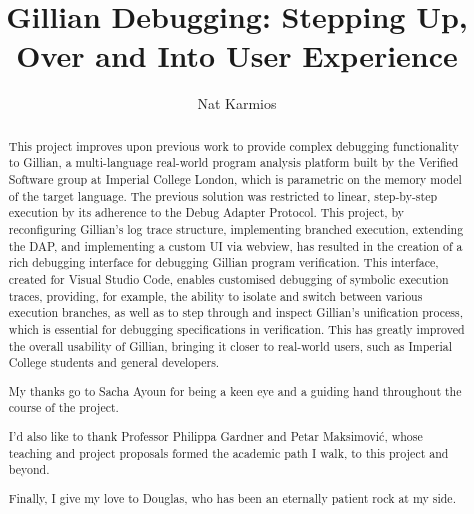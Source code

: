 \documentclass[a4paper, twoside]{report}
\title{Gillian Debugging: Stepping Up, Over and Into User Experience}
\author{Nat Karmios}
\begin{document}
\def\chapterautorefname{\normalcolor{Chapter}\color{blue}}
\def\sectionautorefname{\normalcolor{\S}\kern-0.7ex\color{blue}}
\def\subsectionautorefname{\normalcolor{\S}\kern-0.7ex\color{blue}}
\def\figureautorefname{\normalcolor{Figure}\color{blue}}
\def\lstnumberautorefname{\normalcolor{line}\color{blue}}
\newcommand{\sacha}[1]{\todo[color=green]{S: {#1}}}



\begin{abstract}
This project improves upon previous work to provide complex debugging functionality to
Gillian, a multi-language real-world program analysis platform built by the
Verified Software group at Imperial College London, which is parametric on the memory
model of the target language.
The previous solution was restricted to linear, step-by-step execution by its
adherence to the Debug Adapter Protocol. This project, by reconfiguring Gillian's log
trace structure, implementing branched execution, extending the DAP, and
implementing a custom UI via webview, has resulted in the creation of a rich debugging interface for debugging Gillian program verification.
This interface, created for Visual Studio Code, enables customised debugging of symbolic execution traces, providing, for example, the ability to isolate and switch between various execution branches, as well as to step through and inspect Gillian's unification process, which is essential for debugging specifications in verification. This has greatly improved the overall usability of Gillian, bringing it closer to real-world users, such as Imperial College students and general developers.
\end{abstract}

\renewcommand{\abstractname}{Acknowledgements}
\begin{abstract}
My thanks go to Sacha Ayoun for being a keen eye and a guiding hand throughout
the course of the project.

I'd also like to thank Professor Philippa Gardner and Petar Maksimović,
whose teaching and project proposals formed the academic path I walk, to this
project and beyond.

Finally, I give my love to Douglas, who has been an eternally patient rock at my
side.
\end{abstract}

\listoftodos{}
\tableofcontents










\end{document}
